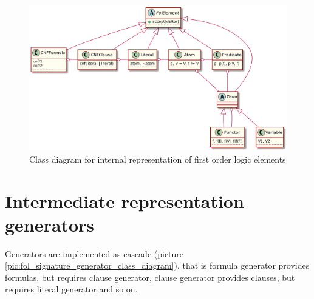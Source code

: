 \begin{figure}[h]
\begin{centering}
  \includegraphics[width=\textwidth]{logic-formula-generator/fol/cnf_fol_elements.png}
  \caption{Class diagram for internal representation of first order logic elements}
  \label{pic:fol_elements_class_diagram}
\end{centering}
\end{figure}

\section{Intermediate representation generators}
\label{sec:Generators}

Generators are implemented as cascade (picture \ref{pic:fol_signature_generator_class_diagram}), that is formula generator provides formulas, but requires clause generator, clause generator provides clauses, but requires literal generator and so on.


